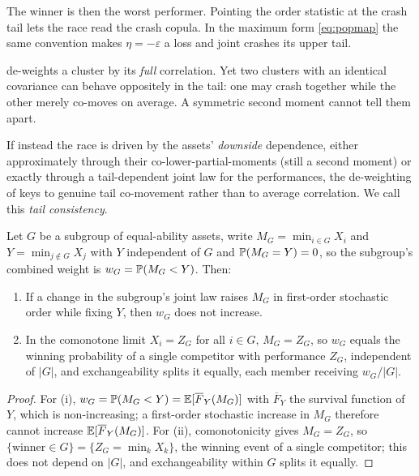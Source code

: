 The
winner is then the worst performer.
Pointing the order statistic at the crash tail
lets the race read the crash copula.
In the maximum form \eqref{eq:popmap} the same
convention makes $\eta = -\varepsilon$ a loss and joint crashes its upper tail.

 de-weights a cluster by its \emph{full} correlation.
Yet two
clusters with an identical covariance can behave oppositely in the tail: one may
crash together while the other merely co-moves on average.
A symmetric second
moment cannot tell them apart.

If instead the race is driven by the assets'
\emph{downside} dependence, either approximately through their co-lower-partial-moments
(still a second moment) or exactly through a tail-dependent joint law for the
performances, the de-weighting of  keys to genuine tail
co-movement rather than to average correlation.
We call this \emph{tail consistency}.

\begin{lemma}
\label{lem:tail}
Let $G$ be a subgroup of equal-ability assets, write
$M_G = \min_{i\in G} X_i$ and $Y = \min_{j\notin G} X_j$ with $Y$ independent of
$G$ and $\mathbb{P}(M_G = Y) = 0$, so the subgroup's combined weight is
$w_G = \mathbb{P}(M_G < Y)$. Then:
\begin{enumerate}
\item[\textup{(i)}] If a change in the subgroup's joint law raises $M_G$ in
  first-order stochastic order while fixing $Y$, then $w_G$ does not increase.
\item[\textup{(ii)}] In the comonotone limit $X_i = Z_G$ for all $i\in G$,
  $M_G = Z_G$, so $w_G$ equals the winning probability of a single competitor with
  performance $Z_G$, independent of $|G|$, and exchangeability splits it equally,
  each member receiving $w_G/|G|$.
\end{enumerate}
\end{lemma}
\begin{proof}
For (i), $w_G = \mathbb{P}(M_G < Y) = \mathbb{E}[\overline F_Y(M_G)]$ with $\overline F_Y$ the
survival function of $Y$, which is non-increasing; a first-order stochastic
increase in $M_G$ therefore cannot increase $\mathbb{E}[\overline F_Y(M_G)]$. For (ii),
comonotonicity gives $M_G = Z_G$, so $\{\text{winner}\in G\} = \{Z_G = \min_k X_k\}$,
the winning event of a single competitor; this does not depend on $|G|$, and
exchangeability within $G$ splits it equally.
\end{proof}

